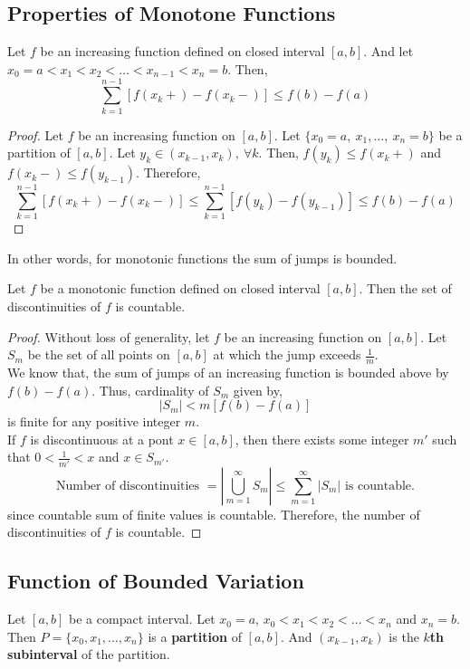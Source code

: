 \subsection{Properties of Monotone Functions}
\begin{theorem}
	Let $f$ be an increasing function defined on closed interval $[a,b]$.
	And let $x_0=a < x_1 < x_2 < \dots <x_{n-1} < x_n = b$.
	Then,
	\[ \sum_{k = 1}^{n-1} [f(x_k+)-f(x_k-)] \le f(b) - f(a) \]
\end{theorem}
\begin{proof}
	Let $f$ be an increasing function on $[a,b]$.
	Let $\{x_0=a,\ x_1, \dots,\ x_n=b\}$ be a partition of $[a,b]$.
	Let $y_k \in (x_{k-1},x_k),\ \forall k$.
	Then, $f(y_k) \le f(x_k+)$ and $f(x_k-) \le f(y_{k-1})$.
	Therefore,
	\[ \sum_{k=1}^{n-1} [f(x_k+) - f(x_k-)] \le \sum_{k=1}^{n-1} [f(y_k) - f(y_{k-1})] \le f(b) - f(a) \]
\end{proof}
\begin{commentary}
	In other words, for monotonic functions the sum of jumps is bounded.
\end{commentary}

\begin{theorem}
	Let $f$ be a monotonic function defined on closed interval $[a,b]$.
	Then the set of discontinuities of $f$ is countable.
\end{theorem}
\begin{proof}
	Without loss of generality, let $f$ be an increasing function on $[a,b]$.
	Let $S_m$ be the set of all points on $[a,b]$ at which the jump exceeds $\frac{1}{m}$.\\

	We know that, the sum of jumps of an increasing function is bounded above by $f(b)-f(a)$.	
	Thus, cardinality of $S_m$ given by,
	\[ |S_m| < m[f(b)-f(a)] \]
	is finite for any positive integer $m$.\\

	If $f$ is discontinuous at a pont $x \in [a,b]$, then there exists some integer $m'$ such that $0 < \frac{1}{m'} < x $ and $x \in S_{m'}$.
	\[ \text{Number of discontinuities } = \left| \bigcup_{m=1}^\infty S_m \right| \le \sum_{m=1}^\infty |S_m| \text{ is countable.}\]
	since countable sum of finite values is countable.
	Therefore, the number of discontinuities of $f$ is countable.
\end{proof}

\subsection{Function of Bounded Variation}
\begin{definition}[partition]
	Let $[a,b]$ be a compact interval.
	Let $x_0 = a$, $x_0 < x_1 < x_2 < \dots < x_n$ and $x_n = b$.
	Then $P = \{ x_0,x_1,\dots,x_n \}$ is a \textbf{partition} of $[a,b]$.
	And $(x_{k-1},x_k)$ is the \textbf{$k$th subinterval} of the partition.
\end{definition}

